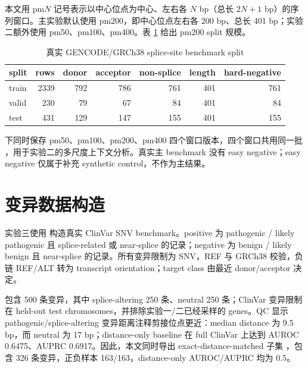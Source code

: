 \documentclass[
    oneside,
    fontset = win,
  ]{njuthesis}
\begin{document}
本文用 pm$N$ 记号表示以中心位点为中心、左右各 $N$ bp（总长 $2N+1$ bp）的序列窗口。主实验默认使用 pm200，即中心位点左右各 200 bp、总长 401 bp；实验二额外使用 pm50、pm100、pm400。表 \ref{tab:data-split} 给出 pm200 split 规模。

\begin{table}[H]
  \centering
  \caption{真实 GENCODE/GRCh38 splice-site benchmark split}
  \label{tab:data-split}
  \begin{tabular}{lrrrrrr}
    \hline
    split & rows & donor & acceptor & non-splice & length & hard-negative \\
    \hline
    train & 2339 & 792 & 786 & 761 & 401 & 761 \\
    valid & 230 & 79 & 67 & 84 & 401 & 84 \\
    test  & 431 & 129 & 147 & 155 & 401 & 155 \\
    \hline
  \end{tabular}
\end{table}

 下同时保存 pm50、pm100、pm200、pm400 四个窗口版本，四个窗口共用同一批 ，用于实验二的多尺度上下文分析。真实主 benchmark 没有 easy negative；easy negative 仅属于补充 synthetic control，不作为主结果。

\section{变异数据构造}

实验三使用  构造真实 ClinVar\cite{landrum2018} SNV benchmark。positive 为 pathogenic / likely pathogenic 且 splice-related 或 near-splice 的记录；negative 为 benign / likely benign 且 near-splice 的记录。所有变异限制为 SNV，REF 与 GRCh38 校验，负链 REF/ALT 转为 transcript orientation；target class 由最近 donor/acceptor 决定。

 包含 500 条变异，其中 splice-altering 250 条、neutral 250 条；ClinVar 变异限制在 held-out test chromosomes，并排除实验一/二已经采样的 genes。QC 显示 pathogenic/splice-altering 变异距离注释剪接位点更近：median distance 为 9.5 bp，而 neutral 为 17 bp；distance-only baseline 在 full ClinVar 上达到 AUROC 0.6475、AUPRC 0.6917。因此，本文同时导出 exact-distance-matched 子集 ，包含 326 条变异，正负样本 163/163，distance-only AUROC/AUPRC 均为 0.5。
\end{document}
